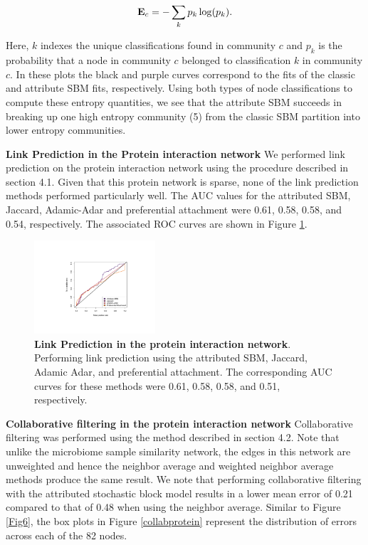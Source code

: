 \documentclass[10pt,journal,compsoc]{IEEEtran}
\begin{document}
\begin{equation}
{\bf E}_{c}=-\sum_{k} p_{k}\log(p_{k}).
\end{equation}

Here, $k$ indexes the unique classifications found in community $c$ and $p_{k}$ is the probability that a node in community $c$ belonged to classification $k$ in community $c$. In these plots the black and purple curves correspond to the fits of the classic and attribute SBM fits, respectively. Using both types of node classifications to compute these entropy quantities, we see that the attribute SBM succeeds in breaking up one high entropy community (5) from the classic SBM partition into lower entropy communities. 

{\bf Link Prediction in the Protein interaction network}
We performed link prediction on the protein interaction network using the procedure described in section 4.1. Given that this protein network is sparse, none of the link prediction methods performed particularly well. The AUC values for the attributed SBM, Jaccard, Adamic-Adar and preferential attachment were 0.61, 0.58, 0.58, and 0.54, respectively. The associated ROC curves are shown in Figure \ref{Fig9}.  

\begin{figure}[h!]
\begin{center}
\includegraphics[width=0.4\textwidth]{ROC_Protein.pdf}
\caption{{\bf Link Prediction in the protein interaction network}. Performing link prediction using the attributed SBM, Jaccard, Adamic Adar, and preferential attachment. The corresponding AUC curves for these methods were 0.61, 0.58, 0.58, and 0.51, respectively.}
\label{Fig9}
\end{center}
\end{figure}
{\bf Collaborative filtering in the protein interaction network}
Collaborative filtering was performed using the method described in section 4.2. Note that unlike the microbiome sample similarity network, the edges in this network are unweighted and hence the neighbor average and weighted neighbor average methods produce the same result. We note that performing collaborative filtering with the attributed stochastic block model results in a lower mean error of 0.21 compared to that of 0.48 when using the neighbor average. Similar to Figure \ref{Fig6}, the box plots in Figure \ref{collabprotein} represent the distribution of errors across each of the 82 nodes.
\end{document}
